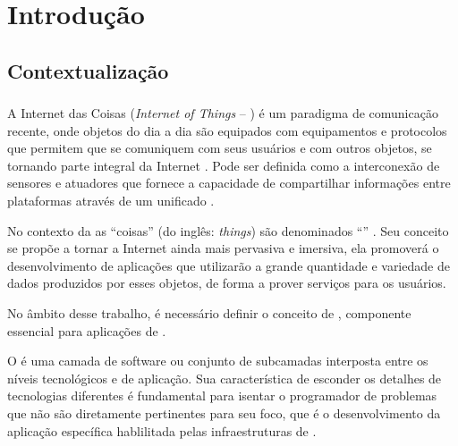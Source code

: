 \chapter{Introdução}

\section{Contextualização}

\subsection{\iot}

A Internet das Coisas (\textit{Internet of Things} -- \iot) é um paradigma de comunicação recente, onde objetos do dia a dia são equipados com equipamentos e protocolos que permitem que se comuniquem com seus usuários e com outros objetos, se tornando parte integral da Internet \cite{Atzori:2010}.  Pode ser definida como a interconexão de sensores e atuadores que fornece a capacidade de compartilhar informações entre plataformas através de um \framework{} unificado \cite{gubbi2013internet}. 

No contexto da \iot{} as ``coisas'' (do inglês: \textit{things}) são denominados ``\smartobjs'' \cite{bandyopadhyay2011internet}. Seu conceito se propõe a tornar a Internet ainda mais pervasiva e imersiva, ela promoverá o desenvolvimento de aplicações que utilizarão a grande quantidade e variedade de dados produzidos por esses objetos, de forma a prover serviços para os usuários. 


No âmbito desse trabalho, é necessário definir o conceito de \middleware{}, componente essencial para aplicações de \iot{}.
\begin{citacao}
	O \middleware{} é uma camada de software ou conjunto de subcamadas interposta entre os níveis tecnológicos e de aplicação. Sua característica de esconder os detalhes de tecnologias diferentes é fundamental para isentar o programador de problemas que não são diretamente pertinentes para seu foco, que é o desenvolvimento da aplicação específica hablilitada pelas infraestruturas de \iot{} \cite[tradução~nossa]{Atzori:2010}.
\end{citacao}

